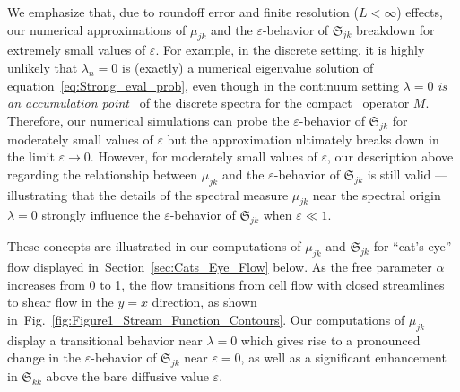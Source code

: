 \documentclass[english,12pt,jmp,graphicx]{revtex4-1}
\newcommand{\secref}[1]{Section~\ref{#1}}
\newcommand{\figref}[1]{Fig.~\ref{#1}}
\newcommand{\Sg}{\mathfrak{S}}
\begin{document}
We emphasize that, due to roundoff error and finite resolution
($L<\infty$) effects, our numerical approximations of $\mu_{jk}$ and 
the $\varepsilon$-behavior of $\Sg_{jk}$ breakdown for extremely
small values of $\varepsilon$. For example, in the discrete setting,
it is highly unlikely that $\lambda_n=0$ is (exactly) a numerical
eigenvalue solution of equation~\eqref{eq:Strong_eval_prob}, even
though in the continuum setting $\lambda=0$ \emph{is an accumulation
point}~\cite{Keener-2000,Stakgold:BVP:2000} of the discrete spectra for
the compact~\cite{Bhattacharya:AAP:1999:951,Bhattacharya:1989:ASD} operator $M$. Therefore,
our numerical simulations can probe the $\varepsilon$-behavior of
$\Sg_{jk}$ for moderately small values of $\varepsilon$ but the approximation
ultimately breaks down in the limit $\varepsilon\to0$.
However, for moderately small values of $\varepsilon$, our description
above regarding  the 
relationship between $\mu_{jk}$ and the $\varepsilon$-behavior of
$\Sg_{jk}$ is still valid --- illustrating that the details of the
spectral measure $\mu_{jk}$ near the spectral origin $\lambda=0$
strongly influence the $\varepsilon$-behavior of
$\Sg_{jk}$ when $\varepsilon\ll1$.




These concepts are illustrated in our computations of $\mu_{jk}$ and
$\Sg_{jk}$ for ``cat's eye'' flow displayed
in~\secref{sec:Cats_Eye_Flow} below. As the free
parameter $\alpha$ increases from 0 to 1, the flow transitions from
cell flow with closed streamlines to shear 
flow in the $y=x$ direction, as shown
in~\figref{fig:Figure1_Stream_Function_Contours}. Our computations of
$\mu_{jk}$ display a 
 transitional behavior near $\lambda=0$ 
which gives rise to a pronounced change in the $\varepsilon$-behavior
of $\Sg_{jk}$ near $\varepsilon=0$, as well as a significant
enhancement in $\Sg_{kk}$ above the bare diffusive value $\varepsilon$. 
\end{document}
